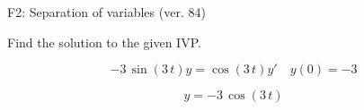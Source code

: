 \begin{exercise}
  \begin{exerciseTitle}F2: Separation of variables (ver. 84)\end{exerciseTitle}
  \begin{exerciseStatement}
    
Find the solution to the given IVP.

    
\[-3 \, \sin\left(3 \, t\right) y= \cos\left(3 \, t\right) y'\hspace{1em} y\left( 0 \right)= -3\]

  \end{exerciseStatement}
  \begin{exerciseAnswer}
    
\[y= -3 \, \cos\left(3 \, t\right)\]

  \end{exerciseAnswer}
\end{exercise}